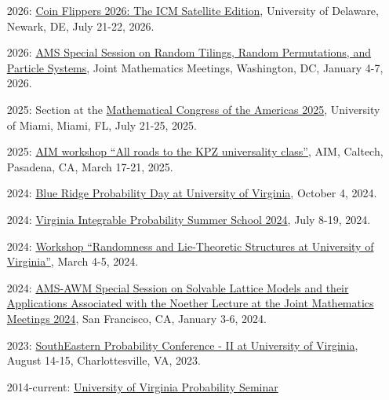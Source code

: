 \documentclass[letterpaper,11pt]{article}
\begin{document}
\begin{itemize}
	\item [2026:]
	\href{https://www.coinflippers.org/}{Coin Flippers 2026: The ICM Satellite Edition},
	University of Delaware,
	Newark, DE,
	July 21-22, 2026.

	\item [2026:]
	\href{https://jointmathematicsmeetings.org/jmm}{AMS Special Session on Random Tilings, Random Permutations, and Particle Systems},
	Joint Mathematics Meetings,
	Washington, DC,
	January 4-7, 2026.

	\item [2025:]
	Section at the
	\href{https://www.math.miami.edu/mca/}{Mathematical Congress of the Americas 2025},
	University of Miami,
	Miami, FL,
	July 21-25, 2025.

	\item [2025:]
	\href{https://aimath.org/pastworkshops/roadtokpz.html}{AIM workshop
	``All roads to the KPZ universality class''},
	AIM, Caltech, Pasadena, CA, March 17-21, 2025.

	\item [2024:]
	\href{https://math.virginia.edu/2024/09/BlueRidgeProb/}{Blue Ridge Probability Day at University of Virginia},
	October 4, 2024.

	\item [2024:]
	\href{https://lpetrov.cc/vipss2024/}{Virginia Integrable Probability Summer School 2024},
	July 8-19, 2024.

	\item [2024:]
	\href{https://math.virginia.edu/random-lie-2024/}{Workshop ``Randomness and Lie-Theoretic Structures at University of Virginia''},
	March 4-5, 2024.

	\item [2024:]
\href{https://www.jointmathematicsmeetings.org/meetings/national/jmm2024/2300_program_ss43.html}{AMS-AWM Special Session on Solvable Lattice Models and their Applications Associated with the Noether Lecture at the Joint Mathematics Meetings 2024},
San Francisco, CA, January 3-6, 2024.

\item [2023:]
\href{https://sites.google.com/view/sepc2023ii/sepc-2023-ii}{SouthEastern Probability Conference - II at University of Virginia},
August 14-15, Charlottesville, VA, 2023.

\item [2014-current:]
\href{http://math.virginia.edu/seminars/probability/}{University of Virginia Probability Seminar}


\end{itemize}
\end{document}
